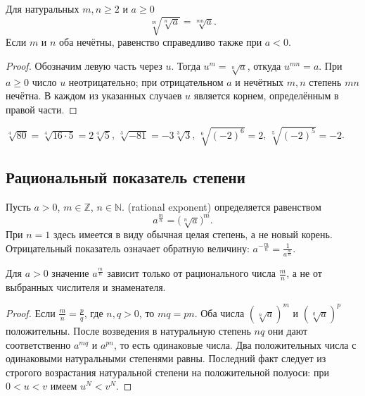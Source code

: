 \begin{theorem}
Для натуральных \(m,n\geq2\) и \(a\geq0\)
\[
\sqrt[m]{\sqrt[n]a}=\sqrt[mn]a.
\]
Если \(m\) и \(n\) оба нечётны, равенство справедливо также при \(a<0\).
\end{theorem}
\begin{proof}
Обозначим левую часть через \(u\). Тогда \(u^m=\sqrt[n]a\), откуда \(u^{mn}=a\). При \(a\geq0\) число \(u\) неотрицательно; при отрицательном \(a\) и нечётных \(m,n\) степень \(mn\) нечётна. В каждом из указанных случаев \(u\) является корнем, определённым в правой части.
\end{proof}

\begin{example}
\(\sqrt[4]{80}=\sqrt[4]{16\cdot5}=2\sqrt[4]5\),
\(\sqrt[3]{-81}=-3\sqrt[3]3\),
\(\sqrt[6]{(-2)^6}=2\),
\(\sqrt[5]{(-2)^5}=-2\).
\end{example}

\subsection*{Рациональный показатель степени}
\begin{definition}
Пусть \(a>0\), \(m\in\mathbb Z\), \(n\in\mathbb N\).  (rational exponent) определяется равенством
\[
a^{\frac mn}=\bigl(\sqrt[n]a\bigr)^m.
\]
При \(n=1\) здесь имеется в виду обычная целая степень, а не новый корень. Отрицательный показатель означает обратную величину: \(a^{-\frac mn}=\frac{1}{a^{\frac mn}}\).
\end{definition}

\begin{theorem}
Для \(a>0\) значение \(a^{\frac mn}\) зависит только от рационального числа \(\frac mn\), а не от выбранных числителя и знаменателя.
\end{theorem}
\begin{proof}
Если \(\frac mn=\frac pq\), где \(n,q>0\), то \(mq=pn\). Оба числа \((\sqrt[n]a)^m\) и \((\sqrt[q]a)^p\) положительны. После возведения в натуральную степень \(nq\) они дают соответственно \(a^{mq}\) и \(a^{pn}\), то есть одинаковые числа. Два положительных числа с одинаковыми натуральными степенями равны. Последний факт следует из строгого возрастания натуральной степени на положительной полуоси: при \(0<u<v\) имеем \(u^N<v^N\).
\end{proof}

